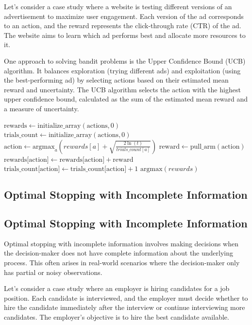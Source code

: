 \documentclass[12pt]{book} %
\begin{document}
Let's consider a case study where a website is testing different versions of an advertisement to maximize user engagement. Each version of the ad corresponds to an action, and the reward represents the click-through rate (CTR) of the ad. The website aims to learn which ad performs best and allocate more resources to it.

One approach to solving bandit problems is the Upper Confidence Bound (UCB) algorithm. It balances exploration (trying different ads) and exploitation (using the best-performing ad) by selecting actions based on their estimated mean reward and uncertainty. The UCB algorithm selects the action with the highest upper confidence bound, calculated as the sum of the estimated mean reward and a measure of uncertainty.
\FloatBarrier
\begin{algorithm}
\caption{Upper Confidence Bound (UCB) Algorithm}\label{ucb}
\begin{algorithmic}[1]
\State $\text{rewards} \gets \text{initialize\_array}(\text{actions}, 0)$
\State $\text{trials\_count} \gets \text{initialize\_array}(\text{actions}, 0)$
    \State $\text{action} \gets \text{argmax}_{a}(rewards[a] + \sqrt{\frac{2\ln(t)}{trials\_count[a]}})$
    \State $\text{reward} \gets \text{pull\_arm}(\text{action})$
    \State $\text{rewards[action]} \gets \text{rewards[action]} + \text{reward}$
    \State $\text{trials\_count[action]} \gets \text{trials\_count[action]} + 1$
\EndFor
\State \Return $\text{argmax}(rewards)$
\EndFunction
\end{algorithmic}
\end{algorithm}
\FloatBarrier
\subsection{Optimal Stopping with Incomplete Information}

\subsection{Optimal Stopping with Incomplete Information}

Optimal stopping with incomplete information involves making decisions when the decision-maker does not have complete information about the underlying process. This often arises in real-world scenarios where the decision-maker only has partial or noisy observations.

Let's consider a case study where an employer is hiring candidates for a job position. Each candidate is interviewed, and the employer must decide whether to hire the candidate immediately after the interview or continue interviewing more candidates. The employer's objective is to hire the best candidate available.
\end{document}
